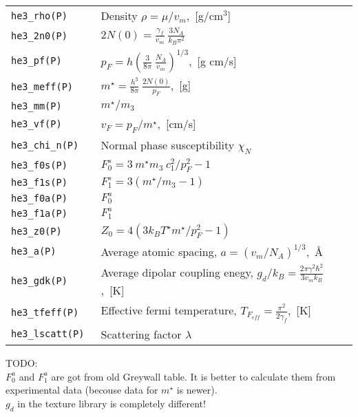 \documentclass[a4paper]{article}
\begin{document}
\medskip
\begin{tabular}{lp{9cm}}
\tt he3\_rho(P)    & Density $\rho = \mu/v_m$,~[g/cm$^3$]\\
\tt he3\_2n0(P)    & $\displaystyle 2N(0) = \frac{\gamma_f}{v_m}
                     \ \frac{3 N_A}{k_B \pi^2}$\\
\tt he3\_pf(P)     & $\displaystyle p_F = h \left(\frac{3}{8\pi}
                     \ \frac{N_A}{v_m}\right)^{1/3}$,~[g cm/s]\\
\tt he3\_meff(P)   & $\displaystyle m^\star = \frac{h^3}{8\pi}
                     \ \frac{2N(0)}{p_F}$,~[g]\\
\tt he3\_mm(P)     & $m^\star/m_3$\\
\tt he3\_vf(P)     & $\displaystyle v_F = p_F/m^\star$,~[cm/s]\\
\tt he3\_chi\_n(P)   & Normal phase susceptibility $\chi_N$\\

\tt he3\_f0s(P)    &$\displaystyle F_0^s = 3\ m^\star m_3\ c_1^2 / p_F^2 - 1$\\
\tt he3\_f1s(P)    &$\displaystyle F_1^s = 3(m^\star/m_3 - 1)$\\
\tt he3\_f0a(P)    &$\displaystyle F_0^a$\\
\tt he3\_f1a(P)    &$\displaystyle F_1^a$\\
\tt he3\_z0(P)     &$\displaystyle Z_0 = 4 (3 k_B T^\star m^\star / p_F^2 - 1)$\\


\tt he3\_a(P)      &Average atomic spacing,
                    $\displaystyle a=(v_m/N_A)^{1/3}$,~\AA\\
\tt he3\_gdk(P)    &Average dipolar coupling enegy,
                    $\displaystyle g_d/k_B = \frac{2\pi\gamma^2\hbar^2}{3 v_m k_B}$,~[K]\\
\tt he3\_tfeff(P)  &Effective fermi temperature,
                    $\displaystyle T_{F_{eff}} = \frac{\pi^2}{2\gamma_f}$,~[K]\\
\tt he3\_lscatt(P) &Scattering factor $\lambda$\\
\end{tabular}
\medskip

\noindent TODO:\\
$F_0^a$ and $F_1^a$ are got from old Greywall table. It is better to
calculate them from experimental data (becouse data for $m^\star$ is newer).\\
$g_d$ in the texture library is completely different!

\eject
{\small}
\end{document}

